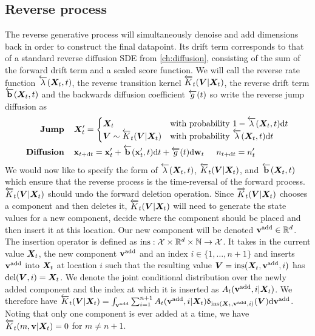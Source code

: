 \subsection{Reverse process}
The reverse generative process will simultaneously denoise and add dimensions back in order to construct the final datapoint. Its drift term corresponds to that of a standard reverse diffusion SDE from \cref{ch:diffusion}, consisting of the sum of the forward drift term and a scaled score function. We will call the reverse rate function $\overleftarrow{\lambda}({\bm{X}}_t, t)$, the reverse transition kernel $\overleftarrow{K}_t({\bm{V}} | {\bm{X}}_t)$, the reverse drift term $\overleftarrow{\mathbf{b}}({\bm{X}}_t, t)$ and the backwards diffusion coefficient $\overleftarrow{g}(t)$ so write the reverse jump diffusion as
\begin{align}
    \label{eq:tddm-reverse-jump}
    \textbf{Jump} \hspace{.4cm} & {\bm{X}}_t' = \begin{cases}
        {\bm{X}}_t & \text{with probability } 1 - \overleftarrow{\lambda}({\bm{X}}_t, t) \mathrm{d} t \\
        {\bm{V}} \sim \overleftarrow{K}_t( {\bm{V}} |{\bm{X}}_t) & \text{with probability } \overleftarrow{\lambda}({\bm{X}}_t, t) \mathrm{d} t
    \end{cases} 
    \\
    \label{eq:tddm-reverse-diffusion}
    \textbf{Diffusion} \hspace{.4cm} &{\mathbf{x}}_{t+ \mathrm{d} t} = {\mathbf{x}}'_t + \overleftarrow{\mathbf{b}}({\mathbf{x}}'_t, t)
    \mathrm{d} t + \overleftarrow{g}(t) \mathrm{d} \mathbf{w}_t \hspace{.5cm} n_{t+\mathrm{d} t} = n_t'
\end{align}
We would now like to specify the form of $\overleftarrow{\lambda}({\bm{X}}_t, t)$, $\overleftarrow{K}_t({\bm{V}}|{\bm{X}}_t)$, and $\overleftarrow{\mathbf{b}}({\bm{X}}_t, t)$ which ensure that the reverse process is the time-reversal of the forward process. 
$\overleftarrow{K}_t({\bm{V}} | {\bm{X}}_t)$ should undo the forward deletion operation. Since $\overrightarrow{K}_t({\bm{V}} | {\bm{X}}_t)$ chooses a component and then deletes it, $\overleftarrow{K}_t({\bm{V}} | {\bm{X}}_t)$ will need to generate the state values for a new component, decide where the component should be placed and then insert it at this location. 
Our new component will be denoted ${\mathbf{v}}^{\textup{add}} \in \mathbb{R}^{d}$. 
The insertion operator is defined as $\text{ins}: {\mathcal{X}} \times \mathbb{R}^{d} \times \mathbb{N} \rightarrow {\mathcal{X}}$. It takes in the current value ${\bm{X}}_t$, the new component ${\mathbf{v}}^{\textup{add}}$ and an index $i \in \{1, \dots, n+1\}$ and inserts ${\mathbf{v}}^{\textup{add}}$ into ${\bm{X}}_t$ at location $i$ such that the resulting value ${\bm{V}} = \text{ins}({\bm{X}}_t, {\mathbf{v}}^{\textup{add}}, i)$ has $\text{del}({\bm{V}}, i) = {\bm{X}}_t$.
We denote the joint conditional distribution over the newly added component and the index at which it is inserted as $A_t({\mathbf{v}}^{\textup{add}}, i | {\bm{X}}_t)$.
We therefore have $\overleftarrow{K}_t({\bm{V}} | {\bm{X}}_t) = \int_{{\mathbf{v}}^{\textup{add}}} \sum_{i=1}^{n+1}  A_t({\mathbf{v}}^{\textup{add}}, i | {\bm{X}}_t) \updelta_{\text{ins}({\bm{X}}_t, {\mathbf{v}}^{\textup{add}}, i)}({\bm{V}}) \mathrm{d} {\mathbf{v}}^{\textup{add}}$. Noting that only one component is ever added at a time, we have $\overleftarrow{K}_t(m, {\mathbf{v}} | {\bm{X}}_t) = 0$ for $m \neq n+1$. 

